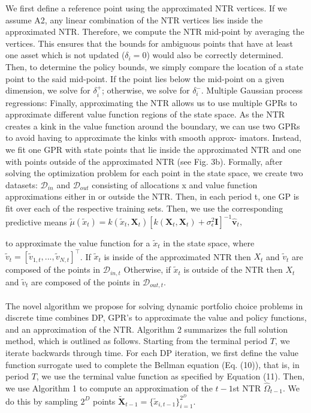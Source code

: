 \documentclass[10pt,a4paper]{article}
\numberwithin{equation}{section} %
\begin{document}
We first define a reference point using the approximated NTR vertices. If we assume
A2, any linear combination of the NTR vertices lies inside the approximated NTR.
Therefore, we compute the NTR mid-point by averaging the vertices. This ensures
that the bounds for ambiguous points that have at least one asset which is not updated
($\delta_i = 0$) would also be correctly determined. Then, to determine the policy bounds,
we simply compare the location of a state point to the said mid-point. If the point lies
below the mid-point on a given dimension, we solve for $\delta^+_i$; otherwise, we solve for
$\delta^-_i$.
Multiple Gaussian process regressions: Finally, approximating the NTR
allows us to use multiple GPRs to approximate different value function regions of the
state space. As the NTR creates a kink in the value function around the boundary,
we can use two GPRs to avoid having to approximate the kinks with smooth approx-
imators. Instead, we fit one GPR with state points that lie inside the approximated
NTR and one with points outside of the approximated NTR (see Fig. 3b). Formally,
after solving the optimization problem for each point in the state space, we create two
datasets: $\mathcal{D}_{in}$ and $\mathcal{D}_{out}$ consisting of allocations x and value function approximations either in or outside the NTR.
Then,
in each period t, one GP is fit over each of the respective training sets. Then, we use
the corresponding predictive means \(
\tilde{\mu}(\tilde{x}_t) = k(\tilde{x}_t, \mathbf{X}_t) \left[ k(\mathbf{X}_t, \mathbf{X}_t) + \sigma_{\epsilon}^2 \mathbf{I} \right]^{-1} \hat{\mathbf{v}}_t,
\)

to approximate the value function for a 
$\tilde{x}_t$ in the state space, where 
$\tilde{v}_t = [\tilde{v}_{1,t}, ..., \tilde{v}_{N,t}]^\top$.
If $\tilde{x}_t$ is inside of the approximated NTR then $X_t$ and $\tilde{v}_t$ are composed of
the points in $\mathcal{D}_{in,t}$  Otherwise, if $\tilde{x}_t$  is outside of the NTR then $X_t$ and 
 $\tilde{v}_t$  are
composed of the points in $\mathcal{D}_{out,t}$.\\~\\
The novel algorithm we propose for solving dynamic portfolio choice problems in discrete time combines DP, GPR's to approximate the value and policy functions, and an approximation of the NTR. Algorithm 2 summarizes the full solution method, which is outlined as follows. Starting from the terminal period $T$, we iterate backwards through time. For each DP iteration, we first define the value function surrogate used to complete the Bellman equation (Eq. (10)), that is, in period $T$, we use the terminal value function as specified by Equation (11). Then, we use Algorithm 1 to compute an approximation of the $t-1$st NTR $\hat{\Omega}_{t-1}$. We do this by sampling $2^D$ points $\tilde{\mathbf{X}}_{t-1} = \{ \tilde{x}_{i,t-1} \}_{i=1}^{2^D}$.
\end{document}
